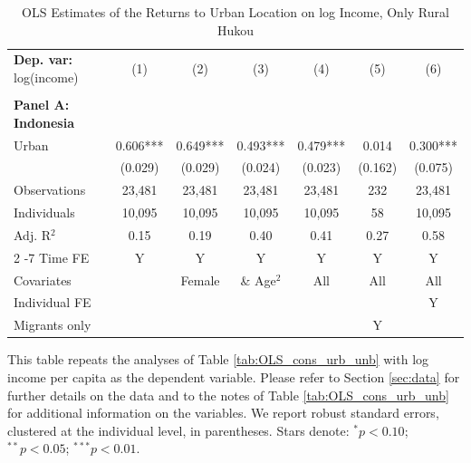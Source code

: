 \begin{table}[htbp] \centering \begin{threeparttable}
 \caption{OLS Estimates of the Returns to Urban Location on log Income, Only Rural Hukou} 
 \label{tab:OLS_CHN_hukou_rural_only_income_urban_unb} 
\begin{tabular}{l cccccc} \toprule  \textbf{Dep. var:}  log(income) 
                    &\multicolumn{1}{c}{(1)}   &\multicolumn{1}{c}{(2)}   &\multicolumn{1}{c}{(3)}   &\multicolumn{1}{c}{(4)}   &\multicolumn{1}{c}{(5)}   &\multicolumn{1}{c}{(6)}   \\
                    &               &               &               &               &               &               \\
\textbf{Panel A: Indonesia} \\
Urban               &       0.606***&       0.649***&       0.493***&       0.479***&       0.014   &       0.300***\\
                    &     (0.029)   &     (0.029)   &     (0.024)   &     (0.023)   &     (0.162)   &     (0.075)   \\
\addlinespace
Observations        &      23,481   &      23,481   &      23,481   &      23,481   &         232   &      23,481   \\
Individuals         &      10,095   &      10,095   &      10,095   &      10,095   &          58   &      10,095   \\
Adj. R$^{2}$        &        0.15   &        0.19   &        0.40   &        0.41   &        0.27   &        0.58   \\
\cmidrule{2 -7} Time FE & Y & Y & Y & Y & Y & Y \\ Covariates & & Female & \& Age$^2$ & All & All & All \\ Individual FE & & & & & & Y \\ Migrants only & & & & & Y & \\ \bottomrule \end{tabular} \begin{tablenotes}[flushleft] \footnotesize \item{This table repeats the analyses of Table \ref{tab:OLS_cons_urb_unb} with log income per capita as the dependent variable. Please refer to Section \ref{sec:data} for further details on the data and to the notes of Table \ref{tab:OLS_cons_urb_unb} for additional information on the variables. We report robust standard errors, clustered at the individual level, in parentheses. Stars denote: $^{*} p<0.10$; $^{**} p<0.05$; $^{***} p<0.01$.} \end{tablenotes} \end{threeparttable} \end{table}
